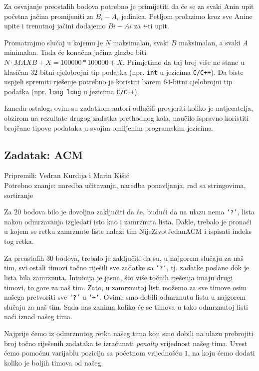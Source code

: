 \documentclass[a4paper]{article}
\begin{document}
Za osvajanje preostalih bodova potrebno je primijetiti da će se za svaki Anin
upit početna jačina promijeniti za $B_i - A_i$ jedinica. Petljom prolazimo kroz
sve Anine upite i trenutnoj jačini dodajemo $Bi - Ai$ za $i$-ti upit.

Promatrajmo slučaj u kojemu je $N$ maksimalan, svaki $B$ maksimalan, a svaki
$A$ minimalan. Tada će konačna jačina glazbe biti $N \cdot MAXB + X = 100000 *
100000 + X$. Primjetimo da taj broj više ne stane u klasičan $32$-bitni
cjelobrojni tip podatka (npr. \texttt{int} u jezicima \texttt{C/C++}). Da
biste uspjeli spremiti rješenje potrebno je koristiti barem $64$-bitni
cjelobrojni tip podatka (npr. \texttt{long long} u jezicima \texttt{C/C++}).

Između ostalog, ovim su zadatkom autori odlučili provjeriti koliko je
natjecatelja, obzirom na rezultate drugog zadatka prethodnog kola, naučilo
ispravno koristiti brojčane tipove podataka u svojim omiljenim programskim
jezicima.

\subsection*{Zadatak: ACM}
\textsf{Pripremili: Vedran Kurdija i Marin Kišić}\\
\textsf{Potrebno znanje: naredba učitavanja, naredba ponavljanja, rad sa
stringovima, sortiranje}

Za $20$ bodova bilo je dovoljno zaključiti da će, budući da na ulazu nema
\texttt{‘?’}, lista nakon odmrzavanja izgledati isto kao i zamrznuta lista.
Dakle, trebalo je pronaći u kojem se retku zamrznute liste nalazi tim
NijeZivotJedanACM i ispisati indeks tog retka.

Za preostalih $30$ bodova, trebalo je zaključiti da su, u najgorem slučaju za
naš tim, svi ostali timovi točno riješili sve zadatke sa \texttt{‘?’}, tj.
zadatke poslane dok je lista bila zamrznuta. Intuicija je jasna, što više
točnih rješenja imaju drugi timovi, to gore za naš tim. Zato, u zamrznutoj
listi možemo za sve timove osim našega pretvoriti sve \texttt{‘?’} u
\texttt{‘+’}. Ovime smo dobili odmrznutu listu u najgorem slučaju za naš tim.
Sada nas zanima koliko će se timova u tako odmrznutoj listi naći iznad našeg
tima.

Najprije ćemo iz odmrznutog retka našeg tima koji smo dobili na ulazu
prebrojiti broj točno riješenih zadataka te izračunati \textit{penalty}
vrijednost našeg tima.  Uvest ćemo pomoćnu varijablu pozicija sa početnom
vrijednošću $1$, na koju ćemo dodati koliko je boljih timova od našeg.
\end{document}
